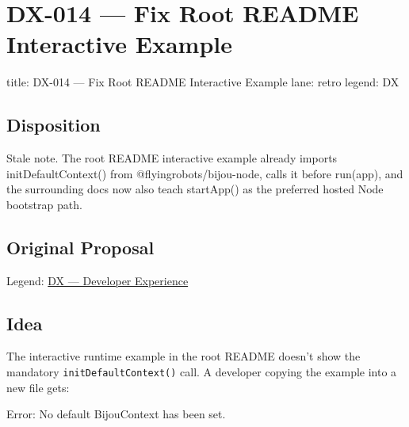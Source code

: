 \chapter{DX-014 --- Fix Root README Interactive Example}\label{record-346}

\smallskip

\begin{RecordMeta}
title: DX-014 — Fix Root README Interactive Example
lane: retro
legend: DX

\end{RecordMeta}

\section{Disposition}\label{record-346-disposition}

Stale note. The root README interactive example already imports initDefaultContext() from @flyingrobots/bijou-node, calls it before run(app), and the surrounding docs now also teach startApp() as the preferred hosted Node bootstrap path.

\section{Original Proposal}\label{record-346-original-proposal}

Legend: \href{https://github.com/flyingrobots/bijou/blob/1853ad902f6bf219326409e7f743a5a1d6517dbc/docs/method/legends/DX-developer-experience.md}{DX --- Developer Experience}

\section{Idea}\label{record-346-idea}

The interactive runtime example in the root README doesn't show the mandatory \texttt{i\allowbreak{}n\allowbreak{}i\allowbreak{}t\allowbreak{}D\allowbreak{}e\allowbreak{}f\allowbreak{}a\allowbreak{}u\allowbreak{}l\allowbreak{}t\allowbreak{}C\allowbreak{}o\allowbreak{}n\allowbreak{}t\allowbreak{}e\allowbreak{}x\allowbreak{}t\allowbreak{}(\allowbreak{})} call. A developer copying the example into a new file gets:

\begin{CodeBlock}
Error: No default BijouContext has been set.
\end{CodeBlock}

